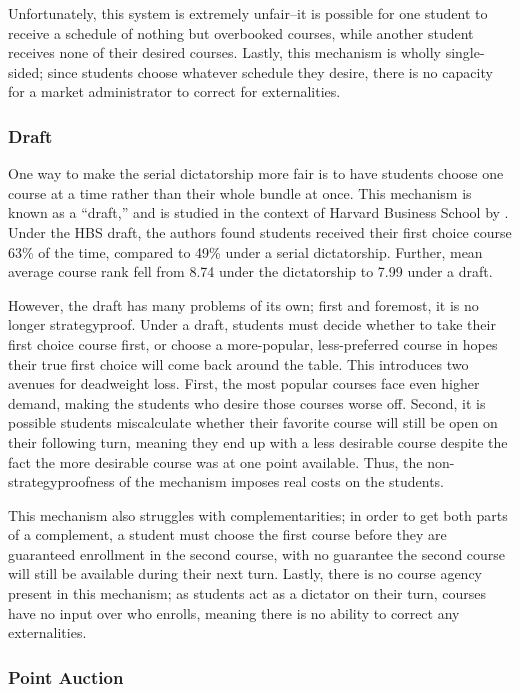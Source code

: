 \documentclass{article}
\begin{document}
Unfortunately, this system is extremely unfair--it is possible for one student to receive a schedule of nothing but overbooked courses, while another student receives none of their desired courses. Lastly, this mechanism is wholly single-sided; since students choose whatever schedule they desire, there is no capacity for a market administrator to correct for externalities.

\subsubsection{Draft}

One way to make the serial dictatorship more fair is to have students choose one course at a time rather than their whole bundle at once. This mechanism is known as a ``draft,'' and is studied in the context of Harvard Business School by \textcite{budish2012}. Under the HBS draft, the authors found students received their first choice course 63\% of the time, compared to 49\% under a serial dictatorship. Further, mean average course rank fell from 8.74 under the dictatorship to 7.99 under a draft. 

However, the draft has many problems of its own; first and foremost, it is no longer strategyproof. Under a draft, students must decide whether to take their first choice course first, or choose a more-popular, less-preferred course in hopes their true first choice will come back around the table. This introduces two avenues for deadweight loss. First, the most popular courses face even higher demand, making the students who desire those courses worse off. Second, it is possible students miscalculate whether their favorite course will still be open on their following turn, meaning they end up with a less desirable course despite the fact the more desirable course was at one point available. Thus, the non-strategyproofness of the mechanism imposes real costs on the students.

This mechanism also struggles with complementarities; in order to get both parts of a complement, a student must choose the first course before they are guaranteed enrollment in the second course, with no guarantee the second course will still be available during their next turn. Lastly, there is no course agency present in this mechanism; as students act as a dictator on their turn, courses have no input over who enrolls, meaning there is no ability to correct any externalities.

\subsubsection{Point Auction}
\end{document}
